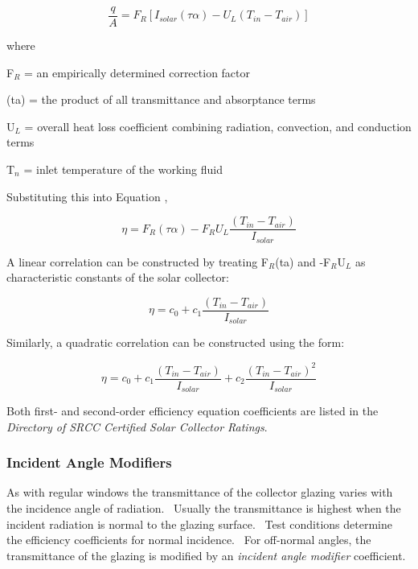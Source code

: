 \begin{equation}
\frac{q}{A} = {F_R}\left[ {{I_{solar}}(\tau \alpha ) - {U_L}({T_{in}} - {T_{air}})} \right]
\end{equation}

where

F\(_{R}\) = an empirically determined correction factor

(ta) = the product of all transmittance and absorptance terms

U\(_{L}\) = overall heat loss coefficient combining radiation, convection, and conduction terms

T\(_{n}\) = inlet temperature of the working fluid

Substituting this into Equation ,

\begin{equation}
\eta  = {F_R}(\tau \alpha ) - {F_R}{U_L}\frac{{({T_{in}} - {T_{air}})}}{{{I_{solar}}}}
\end{equation}

A linear correlation can be constructed by treating F\(_{R}\)(ta) and -F\(_{R}\)U\(_{L}\) as characteristic constants of the solar collector:

\begin{equation}
\eta  = {c_0} + {c_1}\frac{{\left( {{T_{in}} - {T_{air}}} \right)}}{{{I_{solar}}}}
\end{equation}

Similarly, a quadratic correlation can be constructed using the form:

\begin{equation}
\eta  = {c_0} + {c_1}\frac{{\left( {{T_{in}} - {T_{air}}} \right)}}{{{I_{solar}}}} + {c_2}\frac{{{{\left( {{T_{in}} - {T_{air}}} \right)}^2}}}{{{I_{solar}}}}
\end{equation}

Both first- and second-order efficiency equation coefficients are listed in the \emph{Directory of SRCC Certified Solar Collector Ratings}.

\subsubsection{Incident Angle Modifiers}\label{incident-angle-modifiers}

As with regular windows the transmittance of the collector glazing varies with the incidence angle of radiation.~ Usually the transmittance is highest when the incident radiation is normal to the glazing surface.~ Test conditions determine the efficiency coefficients for normal incidence.~ For off-normal angles, the transmittance of the glazing is modified by an \emph{incident angle modifier} coefficient.

